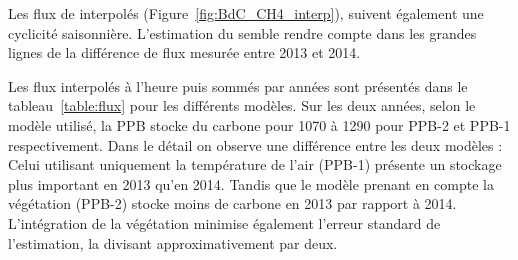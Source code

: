 Les flux de \chh interpolés (Figure~\ref{fig:BdC_CH4_interp}), suivent également une cyclicité saisonnière.
L'estimation du \chh semble rendre compte dans les grandes lignes de la différence de flux mesurée entre 2013 et 2014.





Les flux interpolés à l'heure puis sommés par années sont présentés dans le tableau~\ref{table:flux} pour les différents modèles.
Sur les deux années, selon le modèle utilisé, la PPB stocke du carbone pour 1070 à \SI{1290}{\gcma} pour PPB-2 et PPB-1 respectivement.
Dans le détail on observe une différence entre les deux modèles : 
Celui utilisant uniquement la température de l'air (PPB-1) présente un stockage plus important en 2013 qu'en 2014.
Tandis que le modèle prenant en compte la végétation (PPB-2) stocke moins de carbone en 2013 par rapport à 2014.
L'intégration de la végétation minimise également l'erreur standard de l'estimation, la divisant approximativement par deux.

